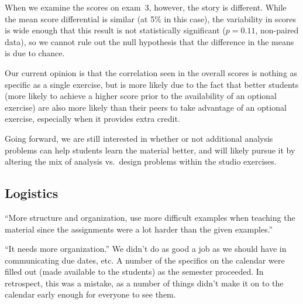 When we examine the scores on exam~3, however, the story is different.
While the mean score differential is similar (at 5\% in this case), the
variability in scores is wide enough that this result is not
statistically significant ($p = 0.11$, non-paired data), so we cannot
rule out the null hypothesis that the difference in the means is
due to chance.

Our current opinion is that the correlation seen in the overall scores
is nothing as specific as a single exercise, but is more likely due to the
fact that better students (more likely to achieve a higher score prior
to the availability of an optional exercise) are also more likely than
their peers to take advantage of an optional exercise, especially when
it provides extra credit.

Going forward, we are still interested in whether or not additional
analysis problems can help students learn the material better, and will
likely pursue it by altering the mix of analysis vs.~design problems
within the studio exercises.

\subsection{Logistics}

``More structure and organization, use more difficult examples when
teaching the material since the assignments were a lot harder than
the given examples.''

``It needs more organization.'' We didn't do as good a job as we should have
in communicating due dates, etc. A number of the specifics on the calendar
were filled out (made available to the students) as the semester proceeded.
In retrospect, this was a mistake, as a number of things didn't make it on
to the calendar early enough for everyone to see them.

